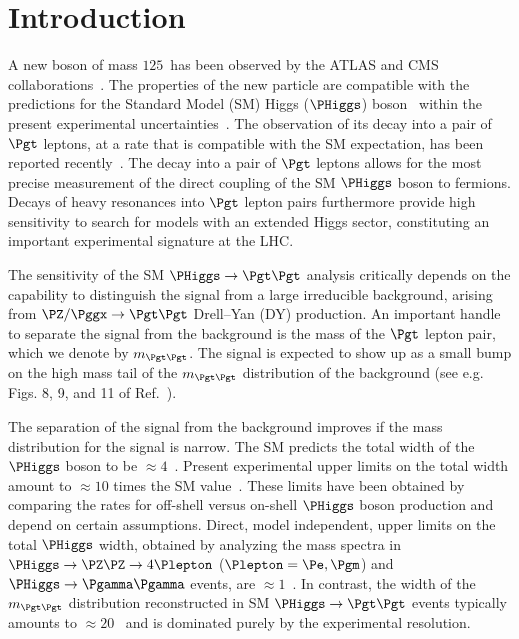 \section{Introduction}
\label{sec:introduction}

A new boson of mass $125$~\GeV has been observed by the ATLAS and CMS collaborations~\cite{Higgs-Discovery_CMS,Higgs-Discovery_ATLAS}.
The properties of the new particle are compatible with the predictions for the Standard Model (SM) 
Higgs ($\PHiggs$) boson~\cite{Englert:1964et,Higgs:1964ia,Higgs:1964pj,Guralnik:1964eu,Higgs:1966ev,Kibble:1967sv}
within the present experimental uncertainties~\cite{HIG-14-014,Chatrchyan:2014tja,Khachatryan:2014iha,HIG-14-009}.
The observation of its decay into a pair of $\Pgt$ leptons, at a rate that is compatible with the SM expectation, has been reported recently~\cite{HIG-15-002}.
The decay into a pair of $\Pgt$ leptons allows for the most precise measurement of the direct coupling of the SM $\PHiggs$ boson to fermions.
Decays of heavy resonances into $\Pgt$ lepton pairs furthermore provide high sensitivity to search for models with an extended Higgs sector,
constituting an important experimental signature at the LHC.

The sensitivity of the SM $\PHiggs \to \Pgt\Pgt$ analysis critically depends on
the capability to distinguish the signal from a large irreducible background, arising from $\PZ/\Pggx \to \Pgt\Pgt$ Drell--Yan (DY) production.
An important handle to separate the signal from the background is the mass of the $\Pgt$ lepton pair, which we denote by $m_{\Pgt\Pgt}$.
The signal is expected to show up as a small bump on the high mass tail of the $m_{\Pgt\Pgt}$ distribution of the background
(see e.g. Figs. 8, 9, and 11 of Ref.~\cite{HIG-13-004}).

The separation of the signal from the background improves if the mass distribution for the signal is narrow.
The SM predicts the total width of the $\PHiggs$ boson to be $\approx 4$~\MeV.
Present experimental upper limits on the total width amount to $\approx 10$ times the SM value~\cite{HIG-14-002,Aad:2015xua}.
These limits have been obtained by comparing the rates for off-shell versus on-shell $\PHiggs$ boson production and depend on certain assumptions.
Direct, model independent, upper limits on the total $\PHiggs$ width, 
obtained by analyzing the mass spectra in $\PHiggs \to \PZ\PZ \to 4 \Plepton$ ($\Plepton = \Pe, \Pgm$) and $\PHiggs \to \Pgamma\Pgamma$ events, are $\approx 1$~\GeV.
In contrast, the width of the $m_{\Pgt\Pgt}$ distribution reconstructed in SM $\PHiggs \to \Pgt\Pgt$ events typically amounts to $\approx 20$~\GeV 
and is dominated purely by the experimental resolution.

